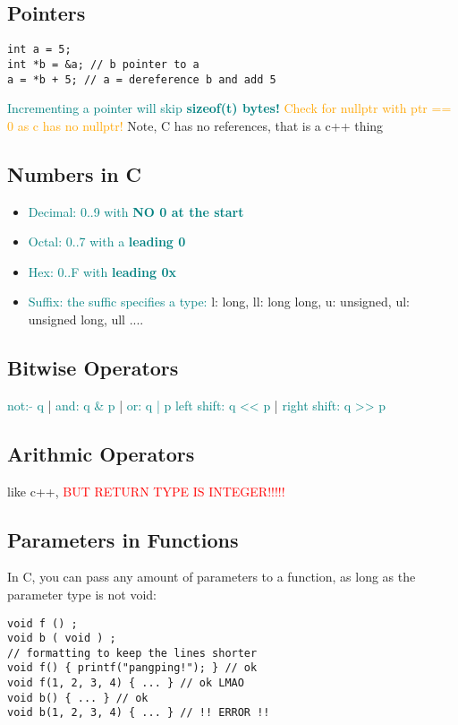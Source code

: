 \documentclass[main.tex,fontsize=8pt,paper=a4,paper=landscape,DIV=calc,]{scrartcl}
\begin{document}
\begin{multicols*}{4}
\subsection{Pointers}
\vspace{-2.5mm}
\begin{lstlisting}
int a = 5;
int *b = &a; // b pointer to a 
a = *b + 5; // a = dereference b and add 5
\end{lstlisting}
\vspace{2mm}
\textcolor{teal}{Incrementing a pointer will skip \textbf{sizeof(t) bytes!}}
\textcolor{orange}{Check for nullptr with ptr == 0 as c has no nullptr!}
Note, C has no references, that is a c++ thing

\subsection{Numbers in C}
\begin{itemize}
\item \textcolor{teal}{Decimal: 0..9 with \textbf{NO 0 at the start}}
\item \textcolor{teal}{Octal: 0..7 with a \textbf{leading 0}}
\item \textcolor{teal}{Hex: 0..F with \textbf{leading 0x}}
\item \textcolor{teal}{Suffix: the suffic specifies a type:}\newline
  l: long, ll: long long, u: unsigned, ul: unsigned long, ull ....
\end{itemize} 

\subsection{Bitwise Operators}
\textcolor{teal}{not: \(\tilde{} \) q} | \textcolor{teal}{and: q \& p} | \textcolor{teal}{or: q | p} \newline
\textcolor{teal}{left shift: q << p} | \textcolor{teal}{right shift: q >> p}

\subsection{Arithmic Operators}
like c++, \textcolor{red}{BUT RETURN TYPE IS INTEGER!!!!!}

\subsection{Parameters in Functions}
In C, you can pass any amount of parameters to a function, as long as the parameter type is not void:
\vspace{-2.5mm}
\begin{lstlisting}
void f () ;
void b ( void ) ;
// formatting to keep the lines shorter
void f() { printf("pangping!"); } // ok
void f(1, 2, 3, 4) { ... } // ok LMAO
void b() { ... } // ok
void b(1, 2, 3, 4) { ... } // !! ERROR !!
\end{lstlisting}
\vspace{2mm}


\end{multicols*}
\end{document}
